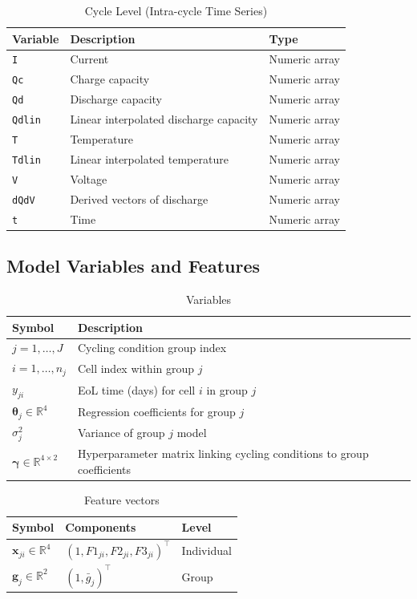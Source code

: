 \begin{table}[H]
\centering
\caption{Cycle Level (Intra-cycle Time Series)}
\label{tab:cycle_level}
\begin{tabular}{lll}
\toprule
Variable & Description & Type \\
\midrule
\texttt{I} & Current & Numeric array \\
\texttt{Qc} & Charge capacity & Numeric array \\
\texttt{Qd} & Discharge capacity & Numeric array \\
\texttt{Qdlin} & Linear interpolated discharge capacity & Numeric array \\
\texttt{T} & Temperature & Numeric array \\
\texttt{Tdlin} & Linear interpolated temperature & Numeric array \\
\texttt{V} & Voltage & Numeric array \\
\texttt{dQdV} & Derived vectors of discharge & Numeric array \\
\texttt{t} & Time & Numeric array \\
\bottomrule
\end{tabular}
\end{table}

\subsection*{Model Variables and Features}


\begin{table}[H]
\centering
\caption{Variables}
\begin{tabular}{ll}
\toprule
Symbol & Description \\
\midrule
$j = 1, \dots, J$ & Cycling condition group index \\
$i = 1, \dots, n_j$ & Cell index within group $j$ \\
$y_{ji}$ & EoL time (days) for cell $i$ in group $j$ \\
$\boldsymbol{\theta}_j \in \mathbb{R}^4$ & Regression coefficients for group $j$ \\
$\sigma^2_j$ & Variance of group $j$ model \\
$\boldsymbol{\gamma} \in \mathbb{R}^{4 \times 2}$ & Hyperparameter matrix linking cycling conditions to group coefficients \\
\bottomrule
\end{tabular}
\end{table}

\begin{table}[H]
\centering
\caption{Feature vectors}
\begin{tabular}{lll}
\toprule
Symbol & Components & Level \\
\midrule
$\mathbf{x}_{ji} \in \mathbb{R}^4$ & $(1, F1_{ji}, F2_{ji}, F3_{ji})^\top$ & Individual \\
$\mathbf{g}_j \in \mathbb{R}^2$ & $(1, \bar{g}_j)^\top$ & Group \\
\bottomrule
\end{tabular}
\end{table}

